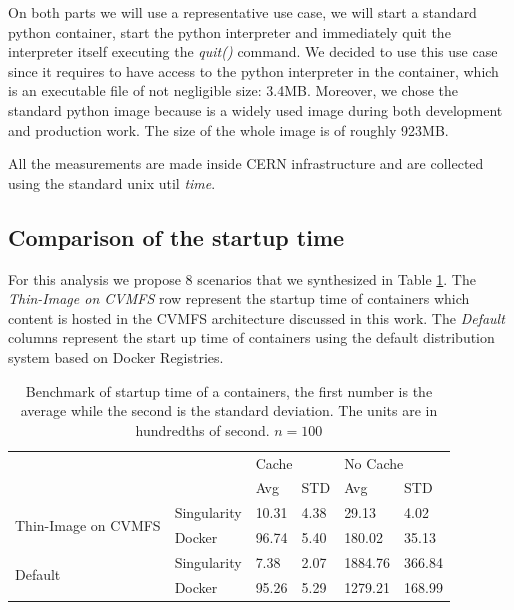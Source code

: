 On both parts we will use a representative use case, we will start a standard
python container, start the python interpreter and immediately quit the
interpreter itself executing the \textit{quit()} command. We decided to use this
use case since it requires to have access to the python interpreter in the
container, which is an executable file of not negligible size: 3.4MB. Moreover, we 
chose the standard python image because is a widely used image during both
development and production work. The size of the whole image is of roughly 923MB.

All the measurements are made inside CERN infrastructure and are collected
using the standard unix util \textit{time}.

\subsection{Comparison of the startup time}

For this analysis we propose 8 scenarios that we synthesized in Table
\ref{tab:benchmark}. The \textit{Thin-Image on CVMFS} row represent the startup
time of containers which content is hosted in the CVMFS architecture discussed
in this work. The \textit{Default} columns represent the start up time of
containers using the default distribution system based on Docker Registries.

\begin{table}[h]
\begin{tabular}{|l|l|l|l|l|l|}
\hline
\multicolumn{2}{|l|}{\multirow{2}{*}{}}            & \multicolumn{2}{l|}{Cache} & \multicolumn{2}{l|}{No Cache} \\ \cline{3-6} 
\multicolumn{2}{|l|}{}                             & Avg          & STD         & Avg            & STD          \\ \hline \hline
\multirow{2}{*}{Thin-Image on CVMFS} & Singularity & 10.31        & 4.38        & 29.13          & 4.02         \\ \cline{2-6} 
                                     & Docker      & 96.74        & 5.40        & 180.02         & 35.13        \\ \hline \hline
\multirow{2}{*}{Default}               & Singularity & 7.38         & 2.07        & 1884.76        & 366.84       \\ \cline{2-6} 
                                     & Docker      & 95.26        & 5.29        & 1279.21        & 168.99       \\ \hline
\end{tabular}
\caption{Benchmark of startup time of a containers, the first number is the average while the second is the standard deviation. The units are in hundredths of second. $n = 100$}
\label{tab:benchmark}
\end{table}

